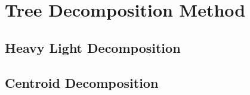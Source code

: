 \documentclass[10pt,landscape,a4paper,twocolumn]{article}
\begin{document}
\section{Tree Decomposition Method}
\subsection{Heavy Light Decomposition}


\subsection{Centroid Decomposition}


\iffalse
\section{Etcetera}

\subsection{Minimum Vertex Cover}
\subsection{Cut Vertex}
\subsection{Cut Edge}
\subsection{Hungarian Method}
\subsection{Line Sweeping}
\subsection{Parametric Search}
\fi
\end{document}
